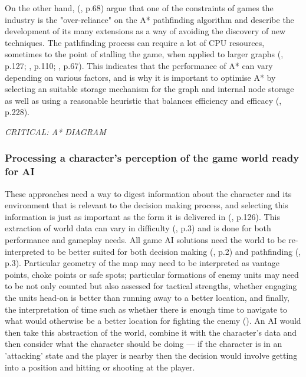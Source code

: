 \documentclass[11pt, a4paper]{article}
\begin{document}
On the other hand, \citeauthor{graham2003pathfinding} (\citeyear{graham2003pathfinding}, p.68) argue that one of the constraints of games the industry is the "over-reliance" on the A* pathfinding algorithm and describe the development of its many extensions as a way of avoiding the discovery of new techniques. The pathfinding process can require a lot of CPU resources, sometimes to the point of stalling the game, when applied to larger graphs (\cite{cui2011based}, p.127; \cite{stentz1996map}, p.110; \cite{graham2003pathfinding}, p.67). This indicates that the performance of A* can vary depending on various factors, and is why it is important to optimise A* by selecting an suitable storage mechanism for the graph and internal node storage as well as using a reasonable heuristic that balances efficiency and efficacy (\cite{millington2019ai}, p.228).

\emph{CRITICAL: A* DIAGRAM}

\subsubsection{Processing a character's perception of the game world ready for AI}

These approaches need a way to digest information about the character and its environment that is relevant to the decision making process, and selecting this information is just as important as the form it is delivered in (\cite{cui2011based}, p.126). This extraction of world data can vary in difficulty (\cite{diller2004behavior}, p.3) and is done for both performance and gameplay needs. All game AI solutions need the world to be re-interpreted to be better suited for both decision making (\cite{buro2004call}, p.2) and pathfinding (\cite{diller2004behavior}, p.3). Particular geometry of the map may need to be interpreted as vantage points, choke points or safe spots; particular formations of enemy units may need to be not only counted but also assessed for tactical strengths, whether engaging the units head-on is better than running away to a better location, and finally, the interpretation of time such as whether there is enough time to navigate to what would otherwise be a better location for fighting the enemy (\cite{buro2004call}). An AI would then take this abstraction of the world, combine it with the character's data and then consider what the character should be doing --- if the character is in an 'attacking' state and the player is nearby then the decision would involve getting into a position and hitting or shooting at the player. 
\end{document}
